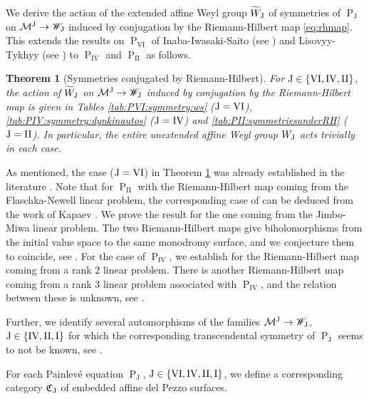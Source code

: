 \documentclass[a4paper,reqno]{amsart}
\numberwithin{equation}{section}
\newcommand{\pain}[1]{\operatorname{P}_{\mathrm{#1}}}
\newtheorem{maintheorem}{Theorem}
\numberwithin{equation}{section}
\begin{document}
We derive the action of the extended affine Weyl group $\widetilde{W}_{\rm{J}}$ of symmetries of $\pain{J}$ on $\mathcal{M}^{\rm{J}}\to\mathscr{W}_{\rm{J}}$ induced by conjugation by the Riemann-Hilbert map \eqref{eq:rhmap}.
This extends the results on $\pain{VI}$ of Inaba-Iwasaki-Saito \cite{inabaiwasakisaito} (see ) and Lisovyy-Tykhyy \cite{lisovyyalgebraic} (see ) to $\pain{IV}$ and $\pain{II}$ as follows. 
\begin{maintheorem}[Symmetries conjugated by Riemann-Hilbert]\label{mainthm:conjugatedsymmetries}
    For $\rm{J}\in \{\rm{VI},\rm{IV},\rm{II}\}$, the action of $\widetilde{W}_{\rm{J}}$ on $\mathcal{M}^{\rm{J}}\to\mathscr{W}_{\rm{J}}$ induced by conjugation by the Riemann-Hilbert map is given in 
    Tables
    \ref{tab:PVI:symmetry:ws} ($\rm{J}=\rm{VI}$), 
    \ref{tab:PIV:symmetry:dynkinautos} ($\rm{J}=\rm{IV}$) and \ref{tab:PII:symmetriesunderRH}  ($\rm{J}=\rm{II}$).
    In particular, the entire unextended affine Weyl group $W_{\rm{J}}$ acts trivially in each case. 
\end{maintheorem}
As mentioned, the case ($\rm{J}=\rm{VI}$) in Theorem \ref{mainthm:conjugatedsymmetries} was already established in the literature \cites{inabaiwasakisaito,lisovyyalgebraic}. 
Note that for $\pain{II}$ with the Riemann-Hilbert map coming from the Flaschka-Newell linear problem, the corresponding case of  can be deduced from the work of Kapaev \cite{kapaev2004}. 
We prove the result for the one coming from the Jimbo-Miwa linear problem.
The two Riemann-Hilbert maps give biholomorphisms from the initial value space to the same monodromy surface, and we conjecture them to coincide, see . 
For the case of $\pain{IV}$, we establish  for the Riemann-Hilbert map coming from a rank 2 linear problem. 
There is another Riemann-Hilbert map coming from a rank 3 linear problem \cite{puttop2013piv} associated with $\pain{IV}$, and the relation between these is unknown, see .


Further, we identify several automorphisms of the families $\mathcal{M}^{\rm{J}}\to \mathscr{W}_{\rm{J}}$, $\rm{J}\in\{ \rm{IV}, \rm{II}, \rm{I}\}$ for which the corresponding transcendental symmetry of $\pain{J}$ seems to not be known, see .


For each Painlev\'e equation $\pain{J}$, $\rm{J}\in\{\rm{VI},\rm{IV},\rm{II},\rm{I}\}$, 
    we define a corresponding category $\mathfrak{C}_{\rm{J}}$ of embedded affine del Pezzo surfaces.
    
\end{document}
